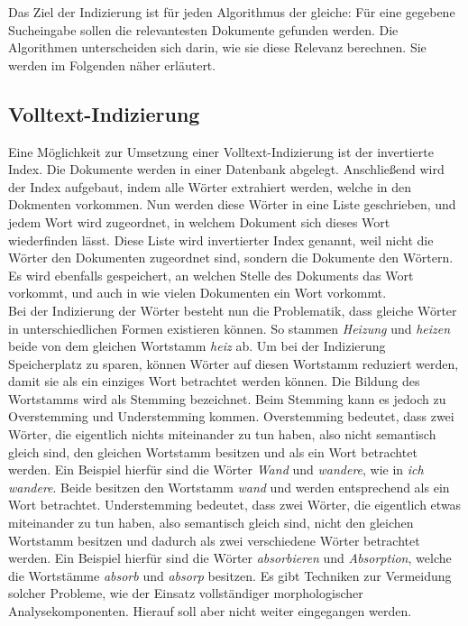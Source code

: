 Das Ziel der Indizierung ist für jeden Algorithmus der gleiche: Für eine gegebene Sucheingabe sollen die relevantesten Dokumente gefunden werden.
Die Algorithmen unterscheiden sich darin, wie sie diese Relevanz berechnen.
Sie werden im Folgenden näher erläutert.

\subsection{Volltext-Indizierung}
Eine Möglichkeit zur Umsetzung einer Volltext-Indizierung ist der invertierte Index.
Die Dokumente werden in einer Datenbank abgelegt.
Anschließend wird der Index aufgebaut, indem alle Wörter extrahiert werden, welche in den Dokmenten vorkommen.
Nun werden diese Wörter in eine Liste geschrieben, und jedem Wort wird zugeordnet, in welchem Dokument sich dieses Wort wiederfinden lässt.
Diese Liste wird invertierter Index genannt, weil nicht die Wörter den Dokumenten zugeordnet sind, sondern die Dokumente den Wörtern.
Es wird ebenfalls gespeichert, an welchen Stelle des Dokuments das Wort vorkommt, und auch in wie vielen Dokumenten ein Wort vorkommt.\\

Bei der Indizierung der Wörter besteht nun die Problematik, dass gleiche Wörter in unterschiedlichen Formen existieren können.
So stammen \textit{Heizung} und \textit{heizen} beide von dem gleichen Wortstamm \textit{heiz} ab.
Um bei der Indizierung Speicherplatz zu sparen, können Wörter auf diesen Wortstamm reduziert werden, damit sie als ein einziges Wort betrachtet werden können.
Die Bildung des Wortstamms wird als Stemming bezeichnet.
Beim Stemming kann es jedoch zu Overstemming und Understemming kommen.
Overstemming bedeutet, dass zwei Wörter, die eigentlich nichts miteinander zu tun haben, also nicht semantisch gleich sind, den gleichen Wortstamm besitzen und als ein Wort betrachtet werden.
Ein Beispiel hierfür sind die Wörter \textit{Wand} und \textit{wandere}, wie in \textit{ich wandere}.
Beide besitzen den Wortstamm \textit{wand} und werden entsprechend als ein Wort betrachtet.
Understemming bedeutet, dass zwei Wörter, die eigentlich etwas miteinander zu tun haben, also semantisch gleich sind, nicht den gleichen Wortstamm besitzen und dadurch als zwei verschiedene Wörter betrachtet werden.
Ein Beispiel hierfür sind die Wörter \textit{absorbieren} und \textit{Absorption}, welche die Wortstämme \textit{absorb} und \textit{absorp} besitzen.
Es gibt Techniken zur Vermeidung solcher Probleme, wie der Einsatz vollständiger morphologischer Analysekomponenten.
Hierauf soll aber nicht weiter eingegangen werden.\\

